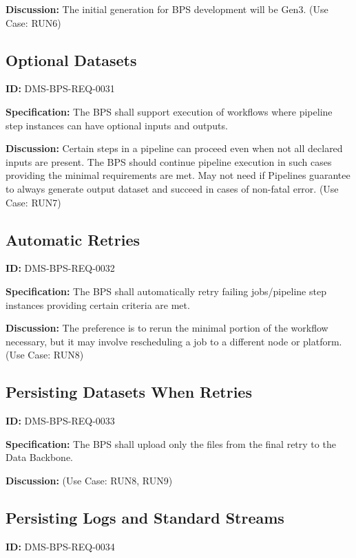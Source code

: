 \documentclass[SE,toc,lsstdraft]{lsstdoc}
\begin{document}
\textbf{Discussion:}
The initial generation for BPS development will be Gen3.  (Use Case: RUN6)

\subsection{Optional Datasets}

\label{DMS-BPS-REQ-0031}
\textbf{ID:} DMS-BPS-REQ-0031

\textbf{Specification:}
The BPS shall support execution of workflows where pipeline step instances can have optional inputs and outputs.

\textbf{Discussion:}
Certain steps in a pipeline can proceed even when not all declared inputs are present. The BPS should continue pipeline execution in such cases providing the minimal requirements are met.   May not need if Pipelines guarantee to always generate output dataset and succeed in cases of non-fatal error.  (Use Case: RUN7)

\subsection{Automatic Retries}

\label{DMS-BPS-REQ-0032}
\textbf{ID:} DMS-BPS-REQ-0032

\textbf{Specification:}
The BPS shall automatically retry failing jobs/pipeline step instances providing certain criteria are met.

\textbf{Discussion:}
The preference is to rerun the minimal portion of the workflow necessary, but it may involve rescheduling a job to a different node or platform.  (Use Case: RUN8)

\subsection{Persisting Datasets When Retries}

\label{DMS-BPS-REQ-0033}
\textbf{ID:} DMS-BPS-REQ-0033

\textbf{Specification:}
The BPS shall upload only the files from the final retry to the Data Backbone.

\textbf{Discussion:}
(Use Case: RUN8, RUN9)

\subsection{Persisting Logs and Standard Streams}

\label{DMS-BPS-REQ-0034}
\textbf{ID:} DMS-BPS-REQ-0034
\end{document}
